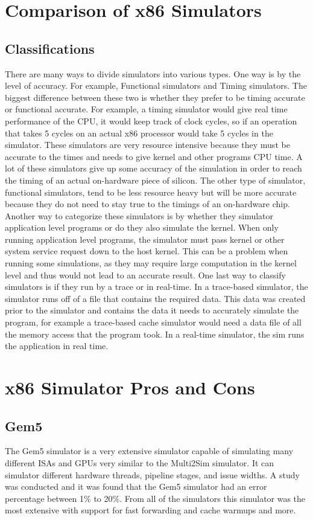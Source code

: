 \documentclass{article}
\begin{document}
 
	\section{Comparison of x86 Simulators}
		\subsection{Classifications}
		There are many ways to divide simulators into various types. One way is by the level of accuracy. For example, Functional simulators and Timing simulators. The biggest difference between these two is whether they prefer to be timing accurate or functional accurate. For example, a timing simulator would give real time performance of the CPU, it would keep track of clock cycles, so if an operation that takes 5 cycles on an actual x86 processor would take 5 cycles in the simulator. These simulators are very resource intensive because they must be accurate to the times and needs to give kernel and other programs CPU time. A lot of these simulators give up some accuracy of the simulation in order to reach the timing of an actual on-hardware piece of silicon. The other type of simulator, functional simulators, tend to be less resource heavy but will be more accurate because they do not need to stay true to the timings of an on-hardware chip. Another way to categorize these simulators is by whether they simulator application level programs or do they also simulate the kernel. When only running application level programs, the simulator must pass kernel or other system service request down to the host kernel. This can be a problem when running some simulations, as they may require large computation in the kernel level and thus would not lead to an accurate result. One last way to classify simulators is if they run by a trace or in real-time. In a trace-based simulator, the simulator runs off of a file that contains the required data. This data was created prior to the simulator and contains the data it needs to accurately simulate the program, for example a trace-based cache simulator would need a data file of all the memory access that the program took. In a real-time simulator, the sim runs the application in real time. 
	\section{x86 Simulator Pros and Cons}
		\subsection{Gem5}
		The Gem5 simulator is a very extensive simulator capable of simulating many different ISAs and GPUs very similar to the Multi2Sim simulator. It can simulator different hardware threads, pipeline stages, and issue widths. A study was conducted and it was found that the Gem5 simulator had an error percentage between 1\% to 20\%. From all of the simulators this simulator was the most extensive with support for fast forwarding and cache warmups and more. 
\end{document}
